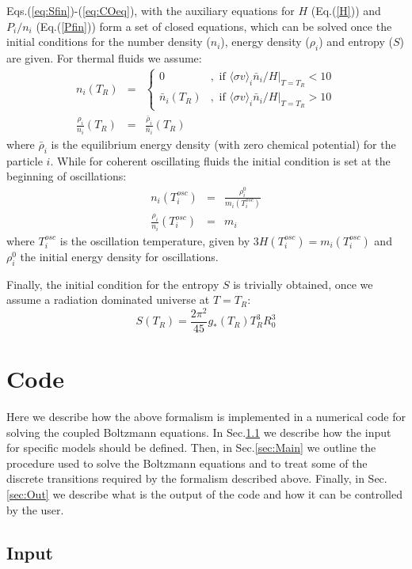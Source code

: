 \documentclass[preprint,notoc]{JHEP3}
\def\be{\begin{equation}}
\def\ee{\end{equation}}
\def\bea{\begin{eqnarray}}
\def\eea{\end{eqnarray}}
\def\sigv{\langle \sigma v \rangle}
\begin{document}
Eqs.(\ref{eq:Sfin})-(\ref{eq:COeq}), with the auxiliary equations for $H$
(Eq.(\ref{H})) and $P_i/n_i$ (Eq.(\ref{Pfin})) form a set of closed equations, which can be solved once the initial conditions for the number
density ($n_i$), energy density ($\rho_i$) and entropy ($S$) are given. For thermal fluids we assume:
\bea
n_i(T_R) & = & \left\{ 
\begin{array}{ll} 
0 & , \mbox{ if $\sigv_i \bar{n}_i/H|_{T=T_R} < 10$} \\
\bar{n}_i(T_R) & , \mbox{ if $\sigv_i \bar{n}_i/H|_{T=T_R} > 10$} 
\end{array} \right. \label{ni0TP} \\
\frac{\rho_i}{n_i}(T_R) & = & \frac{\bar{\rho}_i}{\bar{n}_i}(T_R)
\eea
where $\bar{\rho}_i$ is the equilibrium energy density (with zero chemical potential) for the particle $i$.
While for coherent oscillating fluids the initial condition is set at the beginning of oscillations:
\bea
n_i(T^{osc}_i) & = &\frac{\rho_i^{0}}{m_i(T^{osc}_i)} \\
\frac{\rho_i}{n_i}(T^{osc}_i) & = & m_i
\eea
where $T^{osc}_i$ is the oscillation temperature, given by $3H(T^{osc}_i) = m_i(T^{osc}_i)$ and $\rho_i^{0}$ the
initial energy density for oscillations.

Finally, the initial condition for the entropy $S$ is trivially obtained, once we assume a radiation dominated universe
at $T=T_R$:
\be
S(T_R) = \frac{2 \pi^2}{45} g_*(T_R) T_R^3 R_0^3
\ee



\section{Code}

Here we describe how the above formalism is implemented in a numerical code for solving the coupled Boltzmann equations.
In Sec.\ref{sec:In} we describe how the input for specific models should be defined. Then, in Sec.\ref{sec:Main} we
outline the procedure used to solve the Boltzmann equations and to treat some of the discrete transitions
required by the formalism described above. Finally, in Sec.\ref{sec:Out} we describe what is the output of the code and
how it can be controlled by the user.

\subsection{Input}
\label{sec:In}
\end{document}
